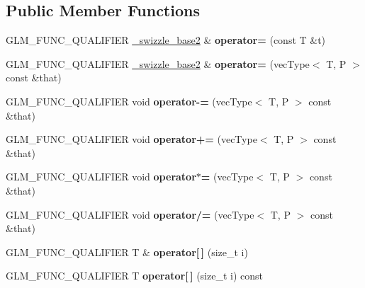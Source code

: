 \subsection*{Public Member Functions}
\begin{DoxyCompactItemize}
\item 
\mbox{\label{structglm_1_1detail_1_1__swizzle__base2_ad10ec021fc0dfb82772b78b2d8fbdde5}} 
G\+L\+M\+\_\+\+F\+U\+N\+C\+\_\+\+Q\+U\+A\+L\+I\+F\+I\+ER \hyperlink{structglm_1_1detail_1_1__swizzle__base2}{\+\_\+swizzle\+\_\+base2} \& {\bfseries operator=} (const T \&t)
\item 
\mbox{\label{structglm_1_1detail_1_1__swizzle__base2_ab4f91d3891e4f4e0acb1e96364527c2b}} 
G\+L\+M\+\_\+\+F\+U\+N\+C\+\_\+\+Q\+U\+A\+L\+I\+F\+I\+ER \hyperlink{structglm_1_1detail_1_1__swizzle__base2}{\+\_\+swizzle\+\_\+base2} \& {\bfseries operator=} (vec\+Type$<$ T, P $>$ const \&that)
\item 
\mbox{\label{structglm_1_1detail_1_1__swizzle__base2_a526ef7902d169766df8eb27d74381187}} 
G\+L\+M\+\_\+\+F\+U\+N\+C\+\_\+\+Q\+U\+A\+L\+I\+F\+I\+ER void {\bfseries operator-\/=} (vec\+Type$<$ T, P $>$ const \&that)
\item 
\mbox{\label{structglm_1_1detail_1_1__swizzle__base2_a20ab7639070ba0bc572b6224d77c1052}} 
G\+L\+M\+\_\+\+F\+U\+N\+C\+\_\+\+Q\+U\+A\+L\+I\+F\+I\+ER void {\bfseries operator+=} (vec\+Type$<$ T, P $>$ const \&that)
\item 
\mbox{\label{structglm_1_1detail_1_1__swizzle__base2_afc710132e971b2121701ec7a5bd8761b}} 
G\+L\+M\+\_\+\+F\+U\+N\+C\+\_\+\+Q\+U\+A\+L\+I\+F\+I\+ER void {\bfseries operator$\ast$=} (vec\+Type$<$ T, P $>$ const \&that)
\item 
\mbox{\label{structglm_1_1detail_1_1__swizzle__base2_adadee6f3dfed945dab83ecd0a2805756}} 
G\+L\+M\+\_\+\+F\+U\+N\+C\+\_\+\+Q\+U\+A\+L\+I\+F\+I\+ER void {\bfseries operator/=} (vec\+Type$<$ T, P $>$ const \&that)
\item 
\mbox{\label{structglm_1_1detail_1_1__swizzle__base2_aa2ddf6ceceefa8a98ef2f7128ce57049}} 
G\+L\+M\+\_\+\+F\+U\+N\+C\+\_\+\+Q\+U\+A\+L\+I\+F\+I\+ER T \& {\bfseries operator\mbox{[}$\,$\mbox{]}} (size\+\_\+t i)
\item 
\mbox{\label{structglm_1_1detail_1_1__swizzle__base2_a32bcfa5111def1015414df50e7f2297f}} 
G\+L\+M\+\_\+\+F\+U\+N\+C\+\_\+\+Q\+U\+A\+L\+I\+F\+I\+ER T {\bfseries operator\mbox{[}$\,$\mbox{]}} (size\+\_\+t i) const
\end{DoxyCompactItemize}

